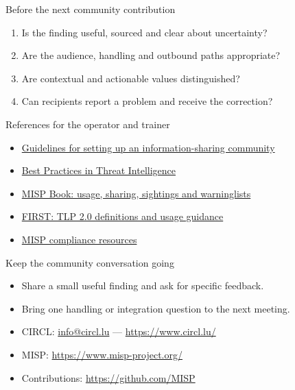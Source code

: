 \begin{frame}{Before the next community contribution}
\begin{enumerate}
\item Is the finding useful, sourced and clear about uncertainty?
\item Are the audience, handling and outbound paths appropriate?
\item Are contextual and actionable values distinguished?
\item Can recipients report a problem and receive the correction?
\end{enumerate}
\end{frame}

\begin{frame}{References for the operator and trainer}
\small
\begin{itemize}
\item \href{https://github.com/MISP/misp-compliance/blob/master/setting-up-ISACs/guidelines_to_set-up_an_ISAC.md}{Guidelines for setting up an information-sharing community}
\item \href{https://www.misp-project.org/best-practices-in-threat-intelligence.html}{Best Practices in Threat Intelligence}
\item \href{https://www.circl.lu/doc/misp/}{MISP Book: usage, sharing, sightings and warninglists}
\item \href{https://www.first.org/tlp/}{FIRST: TLP 2.0 definitions and usage guidance}
\item \href{https://github.com/MISP/misp-compliance}{MISP compliance resources}
\end{itemize}
\end{frame}

\begin{frame}{Keep the community conversation going}
\begin{itemize}
\item Share a small useful finding and ask for specific feedback.
\item Bring one handling or integration question to the next meeting.
\item CIRCL: \href{mailto:info@circl.lu}{info@circl.lu} --- \url{https://www.circl.lu/}
\item MISP: \url{https://www.misp-project.org/}
\item Contributions: \url{https://github.com/MISP}
\end{itemize}
\end{frame}
